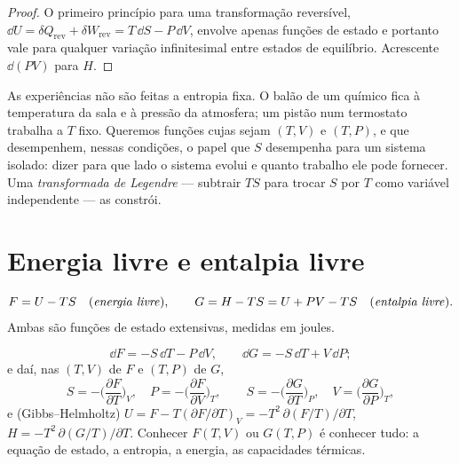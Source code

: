 \begin{proof}
O primeiro princípio para uma transformação reversível, $\dd U = \delta Q_{\text{rev}}
+ \delta W_{\text{rev}} = T\,\dd S - P\,\dd V$, envolve apenas funções de
estado e portanto vale para qualquer variação infinitesimal entre
estados de equilíbrio. Acrescente $\dd(PV)$ para $H$.
\end{proof}

\begin{remark}\label{rem:b2:thermodynamic-potentials:why}
As experiências não são feitas a entropia fixa. O balão de um químico fica à
temperatura da sala e à pressão da atmosfera; um
pistão num termostato trabalha a $T$ fixo. Queremos funções cujas
 sejam $(T,V)$ e $(T,P)$, e que desempenhem, nessas
condições, o papel que $S$ desempenha para um sistema isolado: dizer
para que lado o sistema evolui e quanto trabalho ele pode fornecer. Uma
\emph{transformada de Legendre} --- subtrair $TS$ para trocar $S$ por $T$ como
variável independente --- as constrói.
\end{remark}

\section{Energia livre e entalpia livre}

\begin{definition}\label{def:b2:thermodynamic-potentials:FG}
\[
F = U - TS \quad\text{(\emph{energia livre}\index{energia livre})}, \qquad
G = H - TS = U + PV - TS \quad\text{(\emph{entalpia livre}\index{entalpia livre})}.
\]
Ambas são funções de estado extensivas, medidas em joules.
\end{definition}

\begin{theorem}\label{thm:b2:thermodynamic-potentials:dFdG}
\[
\dd F = -S\,\dd T - P\,\dd V, \qquad
\dd G = -S\,\dd T + V\,\dd P ;
\]
e daí, nas  $(T,V)$ de $F$ e $(T,P)$ de $G$,
\[
S = -\Big(\frac{\partial F}{\partial T}\Big)_V, \quad
P = -\Big(\frac{\partial F}{\partial V}\Big)_T, \qquad
S = -\Big(\frac{\partial G}{\partial T}\Big)_P, \quad
V = \Big(\frac{\partial G}{\partial P}\Big)_T ,
\]
e (Gibbs--Helmholtz) $U = F - T(\partial F/\partial T)_V =
-T^2\,\partial(F/T)/\partial T$, $H = -T^2\,\partial(G/T)/\partial T$.
Conhecer $F(T,V)$ ou $G(T,P)$ é conhecer tudo: a equação de
estado, a entropia, a energia, as capacidades térmicas.
\end{theorem}

